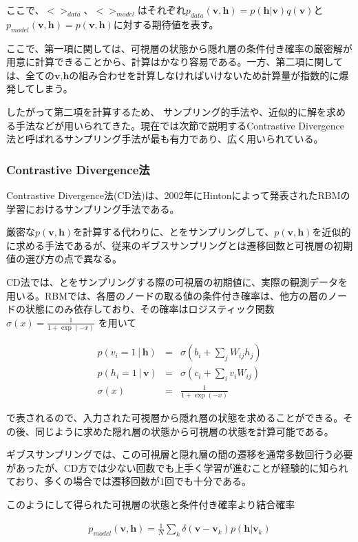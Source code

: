 ここで、$<>_{data}$、$<>_{model}$はそれぞれ$p_{data}(\bm{v},\bm{h})=p(\bm{h}|\bm{v})q(\bm{v})$と$p_{model}(\bm{v},\bm{h})=p(\bm{v},\bm{h})$に対する期待値を表す。

ここで、第一項に関しては、可視層の状態から隠れ層の条件付き確率の厳密解が用意に計算できることから、計算はかなり容易である。一方、第二項に関しては、全ての$\bm{v}$,$\bm{h}$の組み合わせを計算しなければいけないため計算量が指数的に爆発してしまう。

したがって第二項を計算するため、 サンプリング的手法や、近似的に解を求める手法などが用いられてきた。現在では次節で説明するContrastive Divergence法と呼ばれるサンプリング手法が最も有力であり、広く用いられている。

\subsubsection{Contrastive Divergence法}
Contrastive Divergence法(CD法)は、2002年にHintonによって発表されたRBMの学習におけるサンプリング手法である。

厳密な$p(\bm{v},\bm{h})$を計算する代わりに、とをサンプリングして、$p(\bm{v},\bm{h})$を近似的に求める手法であるが、従来のギブスサンプリングとは遷移回数と可視層の初期値の選び方の点で異なる。

CD法では、とをサンプリングする際の可視層の初期値に、実際の観測データを用いる。RBMでは、各層のノードの取る値の条件付き確率は、他方の層のノードの状態にのみ依存しており、その確率はロジスティック関数 $ \sigma(x)= \frac{1}{1 + \exp(-x)} $ を用いて

\begin{eqnarray}
	p(v_i=1│\bm{h}) & = & \sigma(b_i+ \sum_j W_{ij} h_j) \\
	p(h_i=1│\bm{v}) & = & \sigma(c_i+ \sum_i v_i W_{ij}) \\
	\sigma(x)		& = & \frac{1}{1 + \exp(-x)}
\end{eqnarray}

で表されるので、入力された可視層から隠れ層の状態を求めることができる。その後、同じように求めた隠れ層の状態から可視層の状態を計算可能である。

ギブスサンプリングでは、この可視層と隠れ層の間の遷移を通常多数回行う必要があったが、CD方では少ない回数でも上手く学習が進むことが経験的に知られており、多くの場合では遷移回数が1回でも十分である。

このようにして得られた可視層の状態と条件付き確率より結合確率

\begin{eqnarray}
	p_{model}(\bm{v},\bm{h})=\frac{1}{N} \sum_k \delta( \bm{v} - \bm{v}_k ) p(\bm{h}|\bm{v}_k)
\end{eqnarray}

